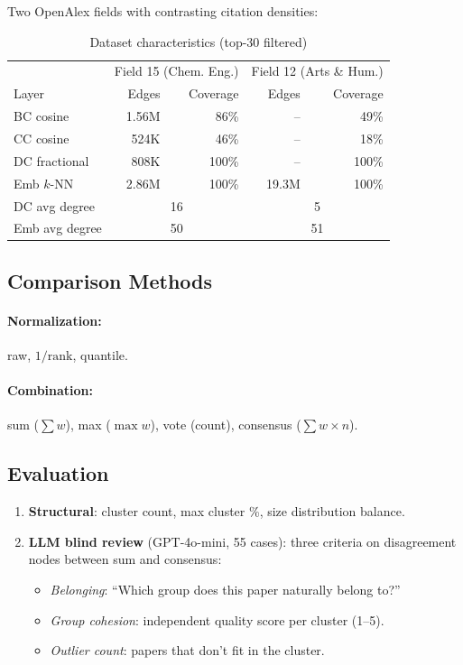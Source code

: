 \documentclass[11pt,a4paper]{article}
\begin{document}
Two OpenAlex fields with contrasting citation densities:

\begin{table}[h]
\centering
\caption{Dataset characteristics (top-30 filtered)}
\begin{tabular}{lrrrr}
\toprule
 & \multicolumn{2}{c}{Field 15 (Chem. Eng.)} & \multicolumn{2}{c}{Field 12 (Arts \& Hum.)} \\
Layer & Edges & Coverage & Edges & Coverage \\
\midrule
BC cosine & 1.56M & 86\% & -- & 49\% \\
CC cosine & 524K & 46\% & -- & 18\% \\
DC fractional & 808K & 100\% & -- & 100\% \\
Emb $k$-NN & 2.86M & 100\% & 19.3M & 100\% \\
\midrule
DC avg degree & \multicolumn{2}{c}{16} & \multicolumn{2}{c}{5} \\
Emb avg degree & \multicolumn{2}{c}{50} & \multicolumn{2}{c}{51} \\
\bottomrule
\end{tabular}
\end{table}

\subsection{Comparison Methods}

\paragraph{Normalization:} raw, $1/\text{rank}$, quantile.
\paragraph{Combination:} sum ($\sum w$), max ($\max w$), vote (count), consensus ($\sum w \times n$).

\subsection{Evaluation}

\begin{enumerate}[nosep]
    \item \textbf{Structural}: cluster count, max cluster \%, size distribution balance.
    \item \textbf{LLM blind review} (GPT-4o-mini, 55 cases): three criteria on disagreement nodes between sum and consensus:
    \begin{itemize}[nosep]
        \item \emph{Belonging}: ``Which group does this paper naturally belong to?''
        \item \emph{Group cohesion}: independent quality score per cluster (1--5).
        \item \emph{Outlier count}: papers that don't fit in the cluster.
    \end{itemize}
\end{enumerate}
\end{document}
